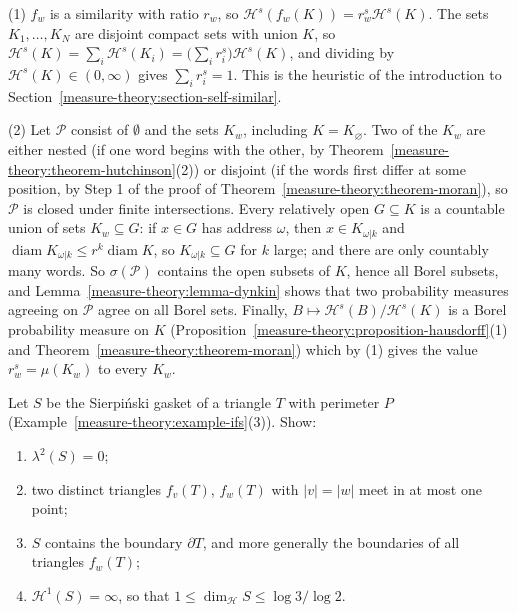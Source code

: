 \begin{solution}
(1) $f_w$ is a similarity with ratio $r_w$, so $\mathcal{H}^s(f_w(K)) = r_w^s\mathcal{H}^s(K)$. The sets $K_1, \ldots, K_N$ are disjoint compact sets with union $K$, so
$\mathcal{H}^s(K) = \sum_i\mathcal{H}^s(K_i) = \bigl(\sum_ir_i^s\bigr)\mathcal{H}^s(K)$, and dividing by $\mathcal{H}^s(K) \in (0, \infty)$ gives $\sum_ir_i^s = 1$. This is the heuristic of the introduction
to Section~\ref{measure-theory:section-self-similar}.

(2) Let $\mathcal{P}$ consist of $\emptyset$ and the sets $K_w$, including $K = K_\varnothing$. Two of the $K_w$ are either nested (if one word begins with the other, by
Theorem~\ref{measure-theory:theorem-hutchinson}(2)) or disjoint (if the words first differ at some position, by Step 1 of the proof of Theorem~\ref{measure-theory:theorem-moran}), so $\mathcal{P}$ is
closed under finite intersections. Every relatively open $G \subseteq K$ is a countable union of sets $K_w \subseteq G$: if $x \in G$ has address $\omega$, then $x \in K_{\omega|k}$ and
$\operatorname{diam}K_{\omega|k} \leq r^k\operatorname{diam}K$, so $K_{\omega|k} \subseteq G$ for $k$ large; and there are only countably many words. So $\sigma(\mathcal{P})$ contains the open subsets of
$K$, hence all Borel subsets, and Lemma~\ref{measure-theory:lemma-dynkin} shows that two probability measures agreeing on $\mathcal{P}$ agree on all Borel sets. Finally,
$B \mapsto \mathcal{H}^s(B)/\mathcal{H}^s(K)$ is a Borel probability measure on $K$ (Proposition~\ref{measure-theory:proposition-hausdorff}(1) and Theorem~\ref{measure-theory:theorem-moran}) which by (1)
gives the value $r_w^s = \mu(K_w)$ to every $K_w$.
\end{solution}

\begin{exercise}\label{measure-theory:exercise-sierpinski}
Let $S$ be the Sierpi\'nski gasket of a triangle $T$ with perimeter $P$ (Example~\ref{measure-theory:example-ifs}(3)). Show:
\begin{enumerate}
\item $\lambda^2(S) = 0$;
\item two distinct triangles $f_v(T)$, $f_w(T)$ with $|v| = |w|$ meet in at most one point;
\item $S$ contains the boundary $\partial T$, and more generally the boundaries of all triangles $f_w(T)$;
\item $\mathcal{H}^1(S) = \infty$, so that $1 \leq \dim_{\mathcal{H}}S \leq \log 3/\log 2$.
\end{enumerate}
\end{exercise}

